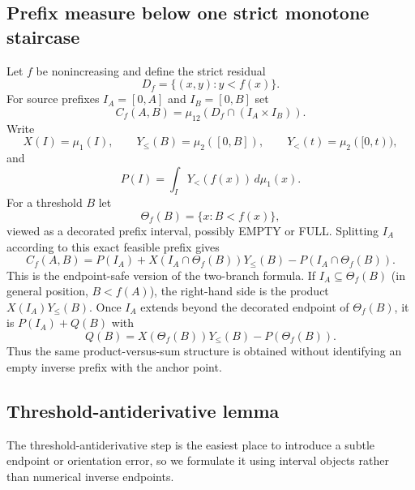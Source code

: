 \documentclass[12pt,a4paper]{article}
\theoremstyle{definition}
\newcommand{\1}{\mathbf 1}
\begin{document}
\subsection{Prefix measure below one strict monotone staircase}

Let $f$ be nonincreasing and define the strict residual
\[
D_f=\{(x,y):y<f(x)\}.
\]
For source prefixes $I_A=[0,A]$ and $I_B=[0,B]$ set
\[
C_f(A,B)=\mu_{12}(D_f\cap(I_A\times I_B)).
\]
Write
\[
X(I)=\mu_1(I),\qquad Y_{\le}(B)=\mu_2([0,B]),\qquad
Y_{<}(t)=\mu_2([0,t)),
\]
and
\[
P(I)=\int_IY_{<}(f(x))\,d\mu_1(x).
\]
For a threshold $B$ let
\[
\Theta_f(B)=\{x:B<f(x)\},
\]
viewed as a decorated prefix interval, possibly EMPTY or FULL.  Splitting $I_A$ according to this exact feasible prefix gives
\begin{equation}
\boxed{
C_f(A,B)=P(I_A)+X(I_A\cap\Theta_f(B))Y_{\le}(B)
-P(I_A\cap\Theta_f(B)).}                                   \label{eq:twobranch}
\end{equation}
This is the endpoint-safe version of the two-branch formula.  If $I_A\subseteq\Theta_f(B)$ (in general position, $B<f(A)$), the right-hand side is the product $X(I_A)Y_{\le}(B)$.  Once $I_A$ extends beyond the decorated endpoint of $\Theta_f(B)$, it is $P(I_A)+Q(B)$ with
\[
Q(B)=X(\Theta_f(B))Y_{\le}(B)-P(\Theta_f(B)).
\]
Thus the same product-versus-sum structure is obtained without identifying an empty inverse prefix with the anchor point.

\subsection{Threshold-antiderivative lemma}

The threshold-antiderivative step is the easiest place to introduce a subtle endpoint or orientation error, so we formulate it using interval objects rather than numerical inverse endpoints.
\end{document}
